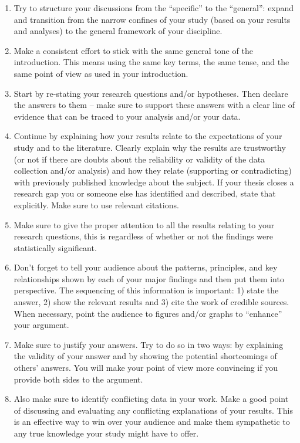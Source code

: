 \documentclass[a4paper,twoside]{bth}
\begin{document}
\begin{enumerate}
    \item Try to structure your discussions from the ``specific'' to the ``general'': expand and transition from the narrow confines of your study (based on your results and analyses) to the general framework of your discipline.
    \item Make a consistent effort to stick with the same general tone of the introduction. This means using the same key terms, the same tense, and the same point of view as used in your introduction.
    \item Start by re-stating your research questions and/or hypotheses. Then declare the answers to them -- make sure to support these answers with a clear line of evidence that can be traced to your analysis and/or your data.
    \item Continue by explaining how your results relate to the expectations of your study and to the literature. Clearly explain why the results are trustworthy (or not if there are doubts about the reliability or validity of the data collection and/or analysis) and how they relate (supporting or contradicting) with previously published knowledge about the subject. If your thesis closes a research gap you or someone else has identified and described, state that explicitly. Make sure to use relevant citations.
    \item Make sure to give the proper attention to all the results relating to your research questions, this is regardless of whether or not the findings were statistically significant.
    \item Don't forget to tell your audience about the patterns, principles, and key relationships shown by each of your major findings and then put them into perspective. The sequencing of this information is important: 1) state the answer, 2) show the relevant results and 3) cite the work of credible sources. When necessary, point the audience to figures and/or graphs to ``enhance'' your argument.
    \item Make sure to justify your answers. Try to do so in two ways: by explaining the validity of your answer and by showing the potential shortcomings of others' answers. You will make your point of view more convincing if you provide both sides to the argument.
    \item Also make sure to identify conflicting data in your work. Make a good point of discussing and evaluating any conflicting explanations of your results. This is an effective way to win over your audience and make them sympathetic to any true knowledge your study might have to offer.

\end{enumerate}
\end{document}
